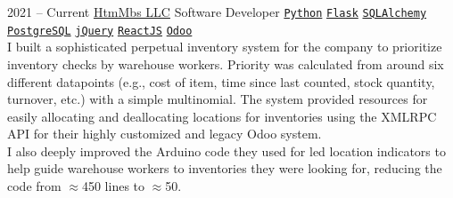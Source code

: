 \documentclass[9pt]{developercv} %
\begin{document}
\begin{entrylist}
    \entry
        {2021 -- Current}
        {\href{https://mbs-standoffs.com}{HtmMbs LLC}}
        {Software Developer}
        {
            \texttt{{\href{https://www.python.org/}{Python}}}\slashsep
            \texttt{{\href{https://flask.palletsprojects.com/en/1.1.x/}{Flask}}}\slashsep
            \texttt{{\href{https://www.sqlalchemy.org/}{SQLAlchemy}}}\slashsep
            \texttt{{\href{https://www.postgresql.org/}{PostgreSQL}}}\slashsep
            \texttt{{\href{https://jquery.com/}{jQuery}}}\slashsep
            \texttt{{\href{https://reactjs.org/}{ReactJS}}}\slashsep
            \texttt{{\href{https://www.odoo.com/}{Odoo}}}\\
            I built a sophisticated perpetual inventory system for the company
            to prioritize inventory checks by warehouse workers. Priority was
            calculated from around six different datapoints (e.g., cost of item,
            time since last counted, stock quantity, turnover, etc.) with a
            simple multinomial. The system provided resources for easily
            allocating and deallocating locations for inventories using the
            XMLRPC API for their highly customized and legacy Odoo system.\\

            I also deeply improved the Arduino code they used for led location
            indicators to help guide warehouse workers to inventories they were
            looking for, reducing the code from $\approx$450 lines to
            $\approx$50.\\

}
\end{entrylist}
\end{document}
